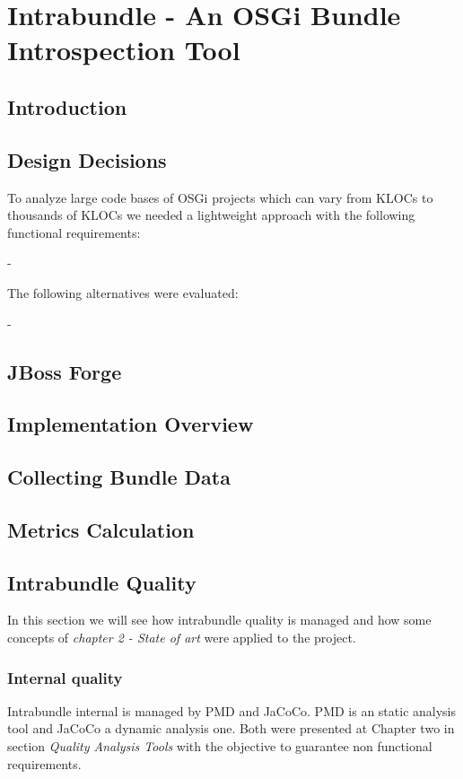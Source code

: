 \chapter{Intrabundle - An OSGi Bundle Introspection Tool}

\section{Introduction}

\section{Design Decisions}
To analyze large code bases of OSGi projects which can vary from KLOCs to thousands of KLOCs we needed a lightweight approach with the following functional requirements:

- 

The following alternatives were evaluated:

-

\section{JBoss Forge}

\section{Implementation Overview}

\section{Collecting Bundle Data}

\section{Metrics Calculation}

\section{Intrabundle Quality}
In this section we will see how intrabundle quality is managed and how some concepts of \textit{chapter 2 - State of art} were applied to the project.
\subsection{Internal quality}
Intrabundle internal is managed by PMD and JaCoCo. PMD is an static analysis tool and JaCoCo a dynamic analysis one. Both were presented at Chapter two in section \textit{Quality Analysis Tools} with the objective to guarantee non functional requirements.


